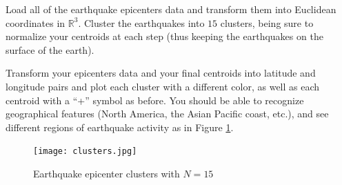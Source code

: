 \begin{problem}
Load all of the earthquake epicenters data and transform them into Euclidean coordinates in $\mathbb{R}^{3}$. Cluster the earthquakes into $15$ clusters, being sure to normalize your centroids at each step (thus keeping the earthquakes on the surface of the earth).
\end{problem}

\begin{problem}
Transform your epicenters data and your final centroids into latitude and longitude pairs and plot each cluster with a different color, as well as each centroid with a ``+'' symbol as before. You should be able to recognize geographical features (North America, the Asian Pacific coast, etc.), and see different regions of earthquake activity as in Figure \ref{fig:earthquakeclusters}.
\end{problem}

\begin{figure}
	\centering
	\texttt{[image: clusters.jpg]}
	\caption{Earthquake epicenter clusters with $N = 15$}
	\label{fig:earthquakeclusters}
\end{figure}
